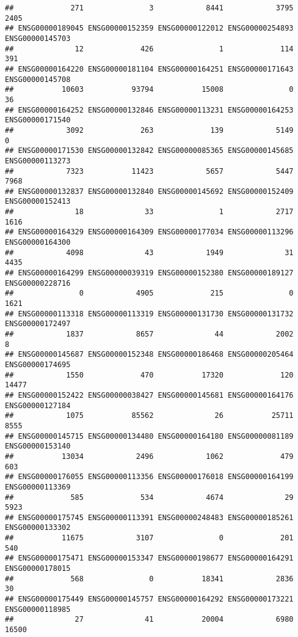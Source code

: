 \documentclass[
]{article}
\begin{document}
\begin{verbatim}
##             271               3            8441            3795            2405 
## ENSG00000189045 ENSG00000152359 ENSG00000122012 ENSG00000254893 ENSG00000145703 
##              12             426               1             114             391 
## ENSG00000164220 ENSG00000181104 ENSG00000164251 ENSG00000171643 ENSG00000145708 
##           10603           93794           15008               0              36 
## ENSG00000164252 ENSG00000132846 ENSG00000113231 ENSG00000164253 ENSG00000171540 
##            3092             263             139            5149               0 
## ENSG00000171530 ENSG00000132842 ENSG00000085365 ENSG00000145685 ENSG00000113273 
##            7323           11423            5657            5447            7968 
## ENSG00000132837 ENSG00000132840 ENSG00000145692 ENSG00000152409 ENSG00000152413 
##              18              33               1            2717            1616 
## ENSG00000164329 ENSG00000164309 ENSG00000177034 ENSG00000113296 ENSG00000164300 
##            4098              43            1949              31            4435 
## ENSG00000164299 ENSG00000039319 ENSG00000152380 ENSG00000189127 ENSG00000228716 
##               0            4905             215               0            1621 
## ENSG00000113318 ENSG00000113319 ENSG00000131730 ENSG00000131732 ENSG00000172497 
##            1837            8657              44            2002               8 
## ENSG00000145687 ENSG00000152348 ENSG00000186468 ENSG00000205464 ENSG00000174695 
##            1550             470           17320             120           14477 
## ENSG00000152422 ENSG00000038427 ENSG00000145681 ENSG00000164176 ENSG00000127184 
##            1075           85562              26           25711            8555 
## ENSG00000145715 ENSG00000134480 ENSG00000164180 ENSG00000081189 ENSG00000153140 
##           13034            2496            1062             479             603 
## ENSG00000176055 ENSG00000113356 ENSG00000176018 ENSG00000164199 ENSG00000113369 
##             585             534            4674              29            5923 
## ENSG00000175745 ENSG00000113391 ENSG00000248483 ENSG00000185261 ENSG00000133302 
##           11675            3107               0             201             540 
## ENSG00000175471 ENSG00000153347 ENSG00000198677 ENSG00000164291 ENSG00000178015 
##             568               0           18341            2836              30 
## ENSG00000175449 ENSG00000145757 ENSG00000164292 ENSG00000173221 ENSG00000118985 
##              27              41           20004            6980           16500 

\end{verbatim}
\end{document}
